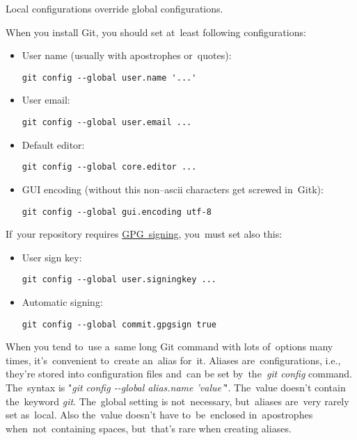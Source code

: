 \warning Local configurations override global configurations.

When you install Git, you should set at~least following configurations:
\begin{itemize}
    \item User name (usually with apostrophes or~quotes):
        \begin{lstlisting}[frame=no, gobble=12]
            git config --global user.name '...'
        \end{lstlisting}
    \item User email:
        \begin{lstlisting}[frame=no, gobble=12]
            git config --global user.email ...
        \end{lstlisting}
    \item Default editor:
        \begin{lstlisting}[frame=no, gobble=12]
            git config --global core.editor ...
        \end{lstlisting}
    \item GUI encoding (without this non--ascii characters get screwed in~Gitk):
        \begin{lstlisting}[frame=no, gobble=12]
            git config --global gui.encoding utf-8
        \end{lstlisting}
\end{itemize}
\noindent If~your repository requires \hyperref[gitgpg]{GPG~signing}, you~must set also this:
\begin{itemize}
    \item User sign key:
        \begin{lstlisting}[frame=no, gobble=12]
            git config --global user.signingkey ...
        \end{lstlisting}
    \item Automatic signing:
        \begin{lstlisting}[frame=no, gobble=12]
            git config --global commit.gpgsign true
        \end{lstlisting}
\end{itemize}

When you tend to~use a~same long Git command with lots of~options many times, it's~convenient to~create an~alias for~it. Aliases are~configurations, i.e., they're stored into configuration files and~can be set by~the~\textit{git config} command. The~syntax is "\textit{git config -{}-global alias.name 'value'}". The~value doesn't contain the~keyword \textit{git}. The~global setting is not~necessary, but~aliases are~very rarely set as~local. Also the~value doesn't have to~be~enclosed in~apostrophes when~not~containing spaces, but~that's rare when creating aliases.\\

